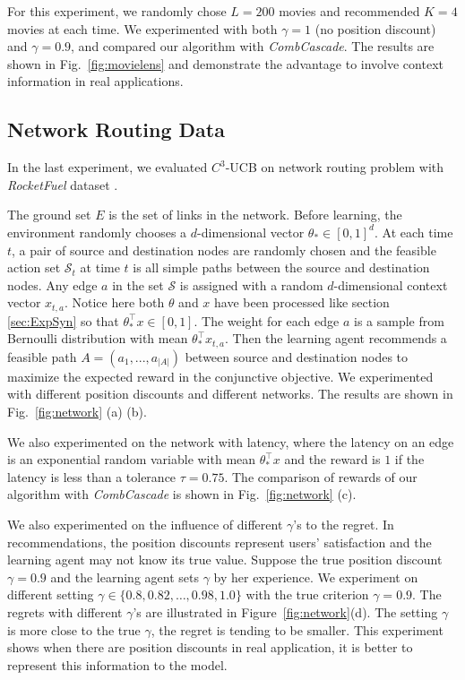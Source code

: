 \documentclass{article}
\newcommand{\cS}{\mathcal{S}}
\begin{document}
For this experiment, we randomly chose $L=200$ movies and recommended $K=4$ movies at each time. We experimented with both $\gamma=1$ (no position discount) and $\gamma=0.9$, and compared our algorithm with {\it CombCascade}. The results are shown in Fig.~\ref{fig:movielens} and demonstrate the advantage to involve context information in real applications.

\subsection{Network Routing Data}

In the last experiment, we evaluated $C^3$-UCB on network routing problem with {\it RocketFuel} dataset \cite{spring2004measuring}.

The ground set $E$ is the set of links in the network. Before learning, the environment randomly chooses a $d$-dimensional vector $\theta_* \in [0,1]^d$. At each time $t$, a pair of source and destination nodes are randomly chosen and the feasible action set $\cS_t$ at time $t$ is all simple paths between the source and destination nodes. Any edge $a$ in the set $\cS$ is assigned with a random $d$-dimensional context vector $x_{t,a}$. Notice here both $\theta$ and $x$ have been processed like section \ref{sec:ExpSyn} so that $\theta_*^{\top}x \in [0,1]$. The weight for each edge $a$ is a sample from Bernoulli distribution with mean $\theta_*^{\top}x_{t,a}$. Then the learning agent recommends a feasible path $A = (a_1,...,a_{|A|})$ between source and destination nodes to maximize the expected reward in the conjunctive objective. We experimented with different position discounts and different networks. The results are shown in Fig.~\ref{fig:network} (a) (b). 

We also experimented on the network with latency, where the latency on an edge is an exponential random variable with mean $\theta_{\ast}^{\top}x$ and the reward is $1$ if the latency is less than a tolerance $\tau = 0.75$. The comparison of rewards of our algorithm with {\it CombCascade} is shown in Fig.~\ref{fig:network} (c).

We also experimented on the influence of different $\gamma$'s to the regret. In recommendations, the position discounts represent users' satisfaction and the learning agent may not know its true value. Suppose the true position discount $\gamma = 0.9$ and the learning agent sets $\gamma$ by her experience. We experiment on different setting $\gamma \in \{0.8, 0.82, \ldots, 0.98, 1.0\}$ with the true criterion $\gamma = 0.9$. The regrets with different $\gamma$'s are illustrated in Figure~\ref{fig:network}(d). The setting $\gamma$ is more close to the true $\gamma$, the regret is tending to be smaller. This experiment shows when there are position discounts in real application, it is better to represent this information to the model.
\end{document}

